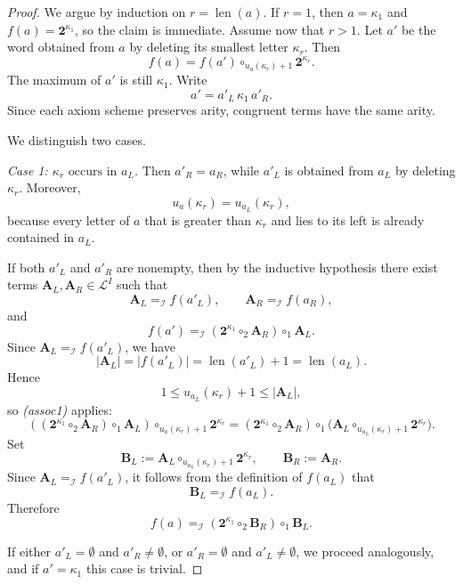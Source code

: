 \documentclass[a4paper]{article}
\theoremstyle{plain}
\theoremstyle{definition}
\theoremstyle{remark}
\numberwithin{equation}{section}
\renewcommand{\le}{\leqslant}\renewcommand{\ge}{\geqslant}
\begin{document}
\begin{proof}
We argue by induction on \(r=\operatorname{len}(a)\). If \(r=1\), then \(a=\kappa_1\) and $f(a)=\mathbf 2^{\kappa_1}$, so the claim is immediate. Assume now that \(r>1\). Let \(a'\) be the word
obtained from \(a\) by deleting its smallest letter \(\kappa_r\). Then
\[
f(a)=f(a')\circ_{u_a(\kappa_r)+1}\mathbf 2^{\kappa_r}.
\]
The maximum of \(a'\) is still \(\kappa_1\). Write
\[
a'=a'_L\,\kappa_1\,a'_R.
\]
Since each axiom scheme preserves arity, congruent terms have the same arity.

We distinguish two cases.

\medskip
\noindent\emph{Case 1: \(\kappa_r\text{ occurs in } a_L\).} Then \(a'_R=a_R\), while \(a'_L\) is obtained from \(a_L\) by deleting
\(\kappa_r\). Moreover,
\[
u_a(\kappa_r)=u_{a_L}(\kappa_r),
\]
because every letter of \(a\) that is greater than \(\kappa_r\) and lies to its
left is already contained in \(a_L\).

\smallskip
\noindent If both \(a'_L\) and \(a'_R\) are nonempty, then by the inductive
hypothesis there exist terms \(\mathbf A_L,\mathbf A_R\in\mathcal L^I\) such that
\[
\mathbf A_L =_{\mathcal I} f(a'_L),\qquad \mathbf A_R =_{\mathcal I} f(a_R),
\]
and
\[
f(a') =_{\mathcal I} (\mathbf 2^{\kappa_1}\circ_2 \mathbf A_R)\circ_1 \mathbf A_L.
\]
Since \(\mathbf A_L =_{\mathcal I} f(a'_L)\), we have
\[
|\mathbf A_L|=|f(a'_L)|=\operatorname{len}(a'_L)+1=\operatorname{len}(a_L).
\]
Hence
\[
1\le u_{a_L}(\kappa_r)+1\le |\mathbf A_L|,
\]
so \emph{(assoc1)} applies:
\[
((\mathbf 2^{\kappa_1}\circ_2 \mathbf A_R)\circ_1 \mathbf A_L)\circ_{u_a(\kappa_r)+1}\mathbf 2^{\kappa_r}
=
(\mathbf 2^{\kappa_1}\circ_2 \mathbf A_R)\circ_1
\bigl(\mathbf A_L\circ_{u_{a_L}(\kappa_r)+1}\mathbf 2^{\kappa_r}\bigr).
\]
Set
\[
\mathbf B_L:=\mathbf A_L\circ_{u_{a_L}(\kappa_r)+1}\mathbf 2^{\kappa_r},
\qquad
\mathbf B_R:=\mathbf A_R.
\]
Since \(\mathbf A_L =_{\mathcal I} f(a'_L)\), it follows from the definition of \(f(a_L)\)
that
\[
\mathbf B_L =_{\mathcal I} f(a_L).
\]
Therefore
\[
f(a)=_{\mathcal I}(\mathbf 2^{\kappa_1}\circ_2 \mathbf B_R)\circ_1 \mathbf B_L.
\]

\smallskip
\noindent If either \(a'_L=\emptyset\) and \(a'_R\neq\emptyset\), or \(a'_R=\emptyset\) and \(a'_L\neq\emptyset\), we proceed analogously, and if \(a'=\kappa_1\) this case is trivial.


\end{proof}
\end{document}
